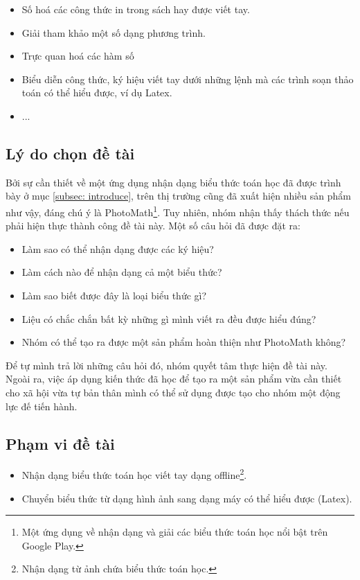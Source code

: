 \documentclass[a4paper,12pt]{article}
\begin{document}
	\begin{itemize}
		\item Số hoá các công thức in trong sách hay được viết tay.
		\item Giải tham khảo một số dạng phương trình.
		\item Trực quan hoá các hàm số
		\item Biểu diễn công thức, ký hiệu viết tay dưới những lệnh mà các trình soạn thảo toán có thể hiểu được, ví dụ Latex.
		\item ...
		
	\end{itemize}
	
	
	
	\subsection{Lý do chọn đề tài}
	Bởi sự cần thiết về một ứng dụng nhận dạng biểu thức toán học đã được trình bày ở mục \ref{subsec: introduce}, trên thị trường cũng đã xuất hiện nhiều sản phẩm như vậy, đáng chú ý là PhotoMath\footnote{Một ứng dụng về nhận dạng và giải các biểu thức toán học nổi bật trên Google Play.}. Tuy nhiên, nhóm nhận thấy thách thức nếu phải hiện thực thành công đề tài này. Một số câu hỏi đã được đặt ra:\\
	\begin{itemize}
		\item Làm sao có thể nhận dạng được các ký hiệu?
		\item Làm cách nào để nhận dạng cả một biểu thức?
		\item Làm sao biết được đây là loại biểu thức gì?
		\item Liệu có chắc chắn bất kỳ những gì mình viết ra đều được hiểu đúng? 
		\item Nhóm có thể tạo ra được một sản phẩm hoàn thiện như PhotoMath không?
		
	\end{itemize}
	
	Để tự mình trả lời những câu hỏi đó, nhóm quyết tâm thực hiện đề tài này. Ngoài ra, việc áp dụng kiến thức đã học để tạo ra một sản phẩm vừa cần thiết cho xã hội vừa tự bản thân mình có thể sử dụng được tạo cho nhóm một động lực đế tiến hành. 
	
	\subsection{Phạm vi đề tài}
	
	\begin{itemize}
		\item Nhận dạng biểu thức toán học viết tay dạng offline\footnote{Nhận dạng từ ảnh chứa biểu thức toán học.}.
		\item Chuyển biểu thức từ dạng hình ảnh sang dạng máy có thể hiểu được (Latex).
		
	\end{itemize}
	
\end{document}
